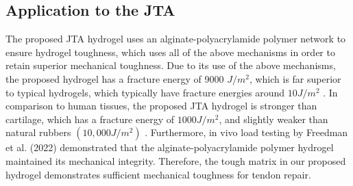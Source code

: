 \subsection{Application to the JTA}
The proposed JTA hydrogel uses an alginate-polyacrylamide polymer network to ensure hydrogel toughness, which uses all of the above mechanisms in order to retain superior mechanical toughness. Due to its use of the above mechanisms, the proposed hydrogel has a fracture energy of 9000 $J/m^2$, which is far superior to typical hydrogels, which typically have fracture energies around $10J/m^2$ . In comparison to human tissues, the proposed JTA hydrogel is stronger than cartilage, which has a fracture energy of $1000 J/m^2$, and slightly weaker than natural rubbers $(10,000 J/m^2)$ \autocite{sun_highly_2012}. Furthermore, in vivo load testing by Freedman et al. (2022) demonstrated that the alginate-polyacrylamide polymer hydrogel maintained its mechanical integrity. Therefore, the tough matrix in our proposed hydrogel demonstrates sufficient mechanical toughness for tendon repair.
